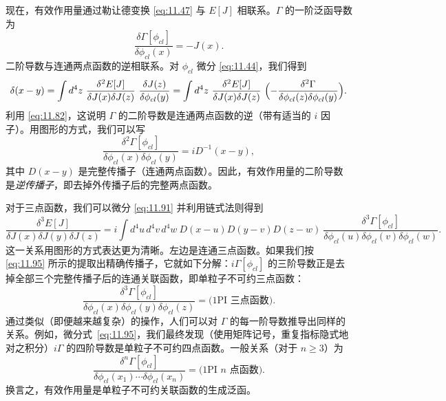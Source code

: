 现在，有效作用量通过勒让德变换 \eqref{eq:11.47} 与 $E[J]$ 相联系。$\Gamma$ 的一阶泛函导数为
\begin{equation}
  \frac{\delta\Gamma[\phi_{cl}]}{\delta\phi_{cl}(x)} = -J(x) .
  \label{eq:11.84}
\end{equation}
二阶导数与连通两点函数的逆相联系。对 $\phi_{cl}$ 微分 \eqref{eq:11.44}，我们得到
\begin{equation}
  \delta(x-y) = \int d^4z\ \frac{\delta^2 E[J]}{\delta J(x)\delta J(z)}\
    \frac{\delta J(z)}{\delta\phi_{cl}(y)}
  = \int d^4z\ \frac{\delta^2 E[J]}{\delta J(x)\delta J(z)}\
    \Bigl( -\frac{\delta^2\Gamma}{\delta\phi_{cl}(z)\delta\phi_{cl}(y)}
      \Bigr) .
  \label{eq:11.90}
\end{equation}
利用 \eqref{eq:11.82}，这说明 $\Gamma$ 的二阶导数是连通两点函数的逆（带有适当的 $i$ 因子）。用图形的方式，我们可以写
\begin{equation}
  \frac{\delta^2\Gamma[\phi_{cl}]}{\delta\phi_{cl}(x)\delta\phi_{cl}(y)}
  = iD^{-1}(x-y) ,
  \label{eq:11.91}
\end{equation}
其中 $D(x-y)$ 是完整传播子（连通两点函数）。因此，有效作用量的二阶导数是\emph{逆传播子}，即去掉外传播子后的完整两点函数。

对于三点函数，我们可以微分 \eqref{eq:11.91} 并利用链式法则得到
\begin{equation}
  \frac{\delta^3 E[J]}{\delta J(x)\delta J(y)\delta J(z)}
  = i\int d^4u\,d^4v\,d^4w\ D(x-u)D(y-v)D(z-w)\
    \frac{\delta^3\Gamma[\phi_{cl}]}
      {\delta\phi_{cl}(u)\delta\phi_{cl}(v)\delta\phi_{cl}(w)} .
  \label{eq:11.95}
\end{equation}
这一关系用图形的方式表达更为清晰。左边是连通三点函数。如果我们按 \eqref{eq:11.95} 所示的提取出精确传播子，它就如下分解：$i\Gamma[\phi_{cl}]$ 的三阶导数正是去掉全部三个完整传播子后的连通关联函数，即单粒子不可约三点函数：
\begin{equation}
  \frac{\delta^3\Gamma[\phi_{cl}]}{\delta\phi_{cl}(x)\delta\phi_{cl}(y)
    \delta\phi_{cl}(z)} = \text{(1PI 三点函数)} .
\end{equation}
通过类似（即便越来越复杂）的操作，人们可以对 $\Gamma$ 的每一阶导数推导出同样的关系。例如，微分式~\eqref{eq:11.95}，我们最终发现（使用矩阵记号，重复指标隐式地对之积分）$i\Gamma$ 的四阶导数是单粒子不可约四点函数。一般关系（对于 $n \ge 3$）为
\begin{equation}
  \frac{\delta^n\Gamma[\phi_{cl}]}{\delta\phi_{cl}(x_1)\cdots
    \delta\phi_{cl}(x_n)} = \text{(1PI } n\text{ 点函数)} .
  \label{eq:11.96}
\end{equation}
换言之，有效作用量是单粒子不可约关联函数的生成泛函。

